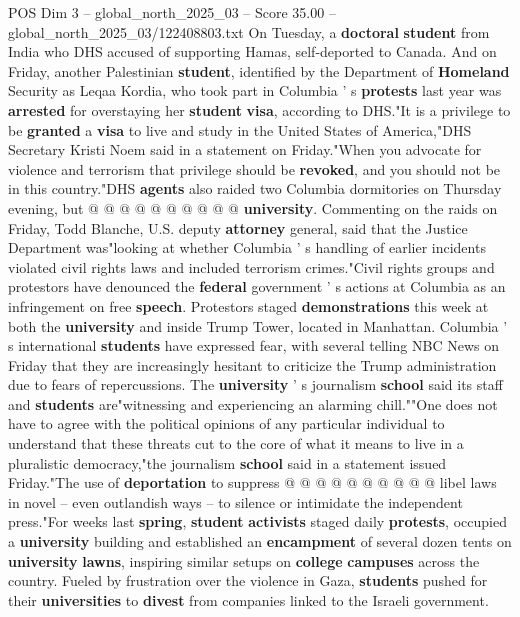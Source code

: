 \begin{textsample}{POS Dim 3 – global\_north\_2025\_03 – Score 35.00 – global\_north\_2025\_03/122408803.txt}
On Tuesday, a \textbf{doctoral} \textbf{student} from India who DHS accused of supporting Hamas, self-deported to Canada.
And on Friday, another Palestinian \textbf{student}, identified by the Department of \textbf{Homeland} Security as Leqaa Kordia, who took part in Columbia ' s \textbf{protests} last year was \textbf{arrested} for overstaying her \textbf{student} \textbf{visa}, according to DHS."It is a privilege to be \textbf{granted} a \textbf{visa} to live and study in the United States of America,"DHS Secretary Kristi Noem said in a statement on Friday."When you advocate for violence and terrorism that privilege should be \textbf{revoked}, and you should not be in this country."DHS \textbf{agents} also raided two Columbia dormitories on Thursday evening, but @ @ @ @ @ @ @ @ @ @ \textbf{university}.
Commenting on the raids on Friday, Todd Blanche, U.S. deputy \textbf{attorney} general, said that the Justice Department was"looking at whether Columbia ' s handling of earlier incidents violated civil rights laws and included terrorism crimes."Civil rights groups and protestors have denounced the \textbf{federal} government ' s actions at Columbia as an infringement on free \textbf{speech}.
Protestors staged \textbf{demonstrations} this week at both the \textbf{university} and inside Trump Tower, located in Manhattan.
Columbia ' s international \textbf{students} have expressed fear, with several telling NBC News on Friday that they are increasingly hesitant to criticize the Trump administration due to fears of repercussions.
The \textbf{university} ' s journalism \textbf{school} said its staff and \textbf{students} are"witnessing and experiencing an alarming chill.""One does not have to agree with the political opinions of any particular individual to understand that these threats cut to the core of what it means to live in a pluralistic democracy,"the journalism \textbf{school} said in a statement issued Friday."The use of \textbf{deportation} to suppress @ @ @ @ @ @ @ @ @ @ libel laws in novel -- even outlandish ways -- to silence or intimidate the independent press."For weeks last \textbf{spring}, \textbf{student} \textbf{activists} staged daily \textbf{protests}, occupied a \textbf{university} building and established an \textbf{encampment} of several dozen tents on \textbf{university} \textbf{lawns}, inspiring similar setups on \textbf{college} \textbf{campuses} across the country.
Fueled by frustration over the violence in Gaza, \textbf{students} pushed for their \textbf{universities} to \textbf{divest} from companies linked to the Israeli government.

\end{textsample}
